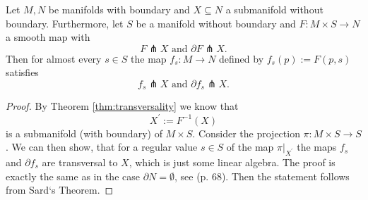     \begin{theorem}
        \label{thm:parametric_transversality}
        Let $M,N$ be manifolds with boundary and $X \subseteq N$ a submanifold without boundary. Furthermore, let $S$ be a manifold without boundary and $F \colon M \times S \to N$ a smooth map with 
        \[
            F \pitchfork X \text{ and } \partial F \pitchfork X.
        \]
        Then for almost every $s \in S$ the map $f_s \colon M \to N$ defined by $f_s(p) := F(p,s)$ satisfies
        \[
            f_s \pitchfork X \text{ and } \partial f_s \pitchfork X.
        \]
    \end{theorem}
    \begin{proof}
        By Theorem \ref{thm:transversality} we know that 
        \[
        X^\prime := F^{-1}(X)
        \]
        is a submanifold (with boundary) of $M \times S$. Consider the projection $\pi \colon M \times S \to S$. We can then show, that for a regular value $s \in S$ of the map $\pi|_{X^\prime}$ the maps $f_s$ and $\partial f_s$ are transversal to $X$, which is just some linear algebra. The proof is exactly the same as in the case $\partial N = \emptyset$, see \cite{guillemin2010differential} (p. 68). Then the statement follows from Sard`s Theorem.
    \end{proof}


